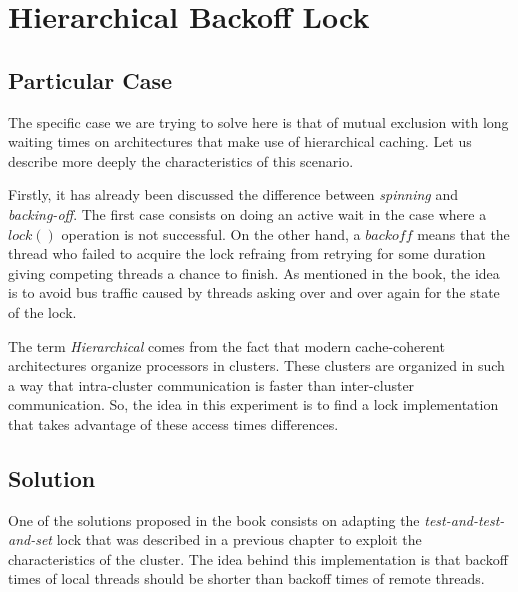 \section{\textbf{Hierarchical Backoff Lock}}
\subsection{Particular Case}
\par
The specific case we are trying to solve here is that of mutual exclusion with long waiting times on architectures that make use of hierarchical caching. Let us describe more deeply the characteristics of this scenario.
\par
Firstly, it has already been discussed the difference between \textit{spinning} and \textit{backing-off}. The first case consists on doing an active wait in the case where a $lock()$ operation is not successful. On the other hand, a $backoff$ means that the thread
who failed to acquire the lock refraing from retrying for some duration giving competing threads a chance to finish. As mentioned in the book, the idea is to avoid bus traffic caused by threads asking over and over again for the state of the lock.
\par
The term \textit{Hierarchical} comes from the fact that modern cache-coherent architectures organize processors in clusters. These clusters are organized in such a way that intra-cluster communication is faster than inter-cluster communication. So, the idea in this experiment is to find a lock implementation that takes advantage of these access times differences.
\par
\subsection{Solution}
\par
One of the solutions proposed in the book consists on adapting the \textit{test-and-test-and-set} lock that was described in a previous chapter to exploit the characteristics of the cluster. The idea behind this implementation is that backoff times of local threads should be shorter than backoff times of remote threads. 
\par
